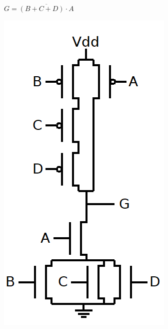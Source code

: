 \documentclass[12pt,letterpaper,titlepage]{article}
\begin{document}
\begin{raggedright}
\begin{paracol}{2}
\switchcolumn
\begin{center}
$G=\overline{(B+C+D)\cdot A}$

\includegraphics[width=\textwidth, height=17\baselineskip, keepaspectratio=true]{hw1q6b}
\end{center}
\end{paracol}


\end{raggedright}
\end{document}
